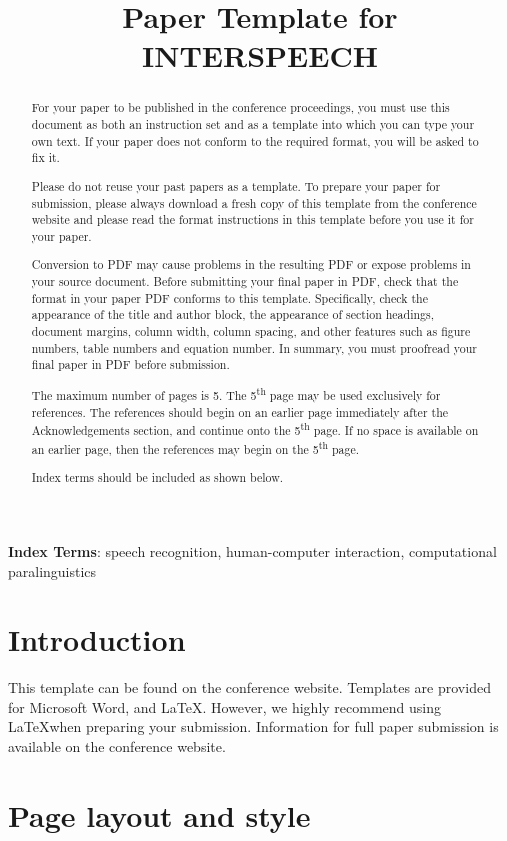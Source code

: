 \documentclass[a4paper]{article}
\title{Paper Template for INTERSPEECH}
\begin{document}
\maketitle
% 
\begin{abstract}
  For your paper to be published in the conference proceedings, you must use this document as both an instruction set and as a template into which you can type your own text. If your paper does not conform to the required format, you will be asked to fix it.

  Please do not reuse your past papers as a template. To prepare your paper for submission, please always download a fresh copy of this template from the conference website and please read the format instructions in this template before you use it for your paper.

  Conversion to PDF may cause problems in the resulting PDF or expose problems in your source document. Before submitting your final paper in PDF, check that the format in your paper PDF conforms to this template. Specifically, check the appearance of the title and author block, the appearance of section headings, document margins, column width, column spacing, and other features such as figure numbers, table numbers and equation number. In summary, you must proofread your final paper in PDF before submission.
  
  The maximum number of pages is 5. The 5\textsuperscript{th} page may be used exclusively for references. The references should begin on an earlier page immediately after the Acknowledgements section, and continue onto the 5\textsuperscript{th} page. If no space is available on an earlier page, then the references may begin on the 5\textsuperscript{th} page.

  Index terms should be included as shown below.
\end{abstract}
\noindent\textbf{Index Terms}: speech recognition, human-computer interaction, computational paralinguistics

\section{Introduction}

This template can be found on the conference website. Templates are provided for Microsoft Word\textregistered, and \LaTeX. However, we highly recommend using \LaTeX when preparing your submission. Information for full paper submission is available on the conference website.

\section{Page layout and style}
\end{document}
